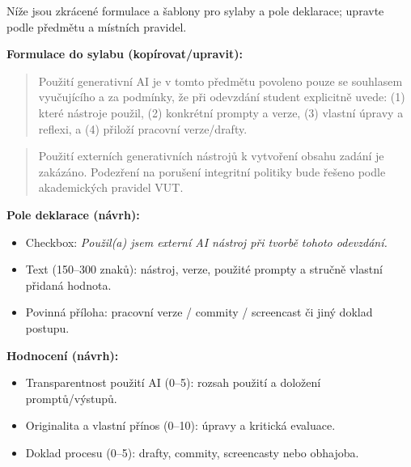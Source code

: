 Níže jsou zkrácené formulace a šablony pro sylaby a pole deklarace; upravte podle předmětu a místních pravidel.

\bigskip

\textbf{Formulace do sylabu (kopírovat/upravit):}

\begin{quote}
\begin{PromptBlock}

Použití generativní AI je v tomto předmětu povoleno pouze se souhlasem vyučujícího a za podmínky, že při odevzdání student explicitně uvede: (1) které nástroje použil, (2) konkrétní prompty a verze, (3) vlastní úpravy a reflexi, a (4) přiloží pracovní verze/drafty.
\end{PromptBlock}

\end{quote}

\begin{quote}
\begin{PromptBlock}

Použití externích generativních nástrojů k vytvoření obsahu zadání je zakázáno. Podezření na porušení integritní politiky bude řešeno podle akademických pravidel VUT.
\end{PromptBlock}

\end{quote}

\bigskip

\textbf{Pole deklarace (návrh):}
\begin{itemize}
  \item Checkbox: \textit{Použil(a) jsem externí AI nástroj při tvorbě tohoto odevzdání.}
  \item Text (150–300 znaků): nástroj, verze, použité prompty a stručně vlastní přidaná hodnota.
  \item Povinná příloha: pracovní verze / commity / screencast či jiný doklad postupu.
\end{itemize}

\bigskip

\textbf{Hodnocení (návrh):}
\begin{itemize}
  \item Transparentnost použití AI (0–5): rozsah použití a doložení promptů/výstupů.
  \item Originalita a vlastní přínos (0–10): úpravy a kritická evaluace.
  \item Doklad procesu (0–5): drafty, commity, screencasty nebo obhajoba.
\end{itemize}

